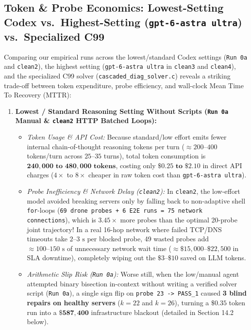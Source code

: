 \documentclass[11pt,a4paper]{article}
\theoremstyle{definition}
\theoremstyle{remark}
\begin{document}
\subsection{Token \& Probe Economics: Lowest-Setting Codex vs.\ Highest-Setting (\texttt{gpt-6-astra ultra}) vs.\ Specialized C99}

Comparing our empirical runs across the lowest/standard Codex settings (\texttt{Run 0a} and \texttt{clean2}), the highest setting (\texttt{gpt-6-astra ultra} in \texttt{clean3} and \texttt{clean4}), and the specialized C99 solver (\texttt{cascaded\_diag\_solver.c}) reveals a striking trade-off between token expenditure, probe efficiency, and wall-clock Mean Time To Recovery (MTTR):

\begin{enumerate}[leftmargin=1.6em]
    \item \textbf{Lowest / Standard Reasoning Setting Without Scripts (\texttt{Run 0a} Manual \& \texttt{clean2} HTTP Batched Loops):}
    \begin{itemize}
        \item \emph{Token Usage \& API Cost:} Because standard/low effort emits fewer internal chain-of-thought reasoning tokens per turn ($\approx 200\text{--}400$ tokens/turn across $25\text{--}35$ turns), total token consumption is $\mathbf{240{,}000\text{ to }480{,}000\text{ tokens}}$, costing only $\mathbf{\$0.25\text{ to }\$2.10}$ in direct API charges ($4\times$ to $8\times$ cheaper in raw token cost than \texttt{gpt-6-astra ultra}).
        \item \emph{Probe Inefficiency \& Network Delay (\texttt{clean2}):} In \texttt{clean2}, the low-effort model avoided breaking servers only by falling back to non-adaptive shell \texttt{for}-loops (\texttt{69 drone probes + 6 E2E runs = 75 network connections}), which is $\mathbf{3.45\times}$ more probes than the optimal 20-probe joint trajectory! In a real 16-hop network where failed TCP/DNS timeouts take $2\text{--}3\text{ s}$ per blocked probe, 49 wasted probes add $\approx 100\text{--}150\text{ s}$ of unnecessary network wait time ($\approx \$15{,}000\text{--}\$22{,}500$ in SLA downtime), completely wiping out the $\$3\text{--}\$10$ saved on LLM tokens.
        \item \emph{Arithmetic Slip Risk (\texttt{Run 0a}):} Worse still, when the low/manual agent attempted binary bisection in-context without writing a verified solver script (\texttt{Run 0a}), a single sign flip on \texttt{probe 23 -> PASS\_1} caused \textbf{3 blind repairs on healthy servers} ($k=22$ and $k=26$), turning a $\$0.35$ token run into a $\mathbf{\$587{,}400}$ infrastructure blackout (detailed in Section 14.2 below).
    \end{itemize}


\end{enumerate}
\end{document}
